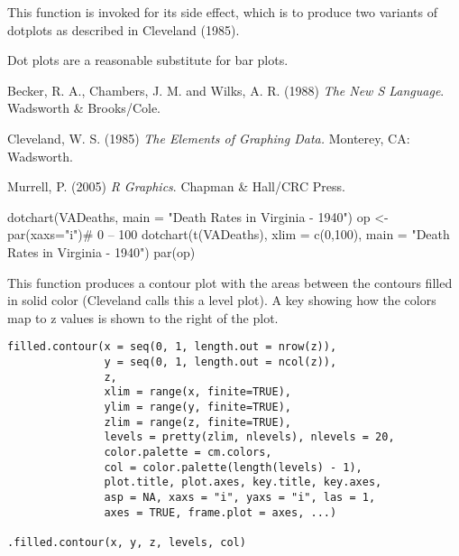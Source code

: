 %
\begin{Value}
This function is invoked for its side effect, which is to produce two
variants of dotplots as described in Cleveland (1985).

Dot plots are a reasonable substitute for bar plots.
\end{Value}
%
\begin{References}\relax
Becker, R. A., Chambers, J. M. and Wilks, A. R. (1988)
\emph{The New S Language}.
Wadsworth \& Brooks/Cole.

Cleveland, W. S. (1985)
\emph{The Elements of Graphing Data.}
Monterey, CA: Wadsworth.

Murrell, P. (2005) \emph{R Graphics}. Chapman \& Hall/CRC Press.
\end{References}
%
\begin{Examples}
\begin{ExampleCode}
dotchart(VADeaths, main = "Death Rates in Virginia - 1940")
op <- par(xaxs="i")# 0 -- 100%
dotchart(t(VADeaths), xlim = c(0,100),
         main = "Death Rates in Virginia - 1940")
par(op)
\end{ExampleCode}
\end{Examples}
%
\begin{Description}\relax
This function produces a contour plot with the areas between the
contours filled in solid color (Cleveland calls this a level plot).  A
key showing how the colors map to z values is shown to the right of
the plot.
\end{Description}
%
\begin{Usage}
\begin{verbatim}
filled.contour(x = seq(0, 1, length.out = nrow(z)),
               y = seq(0, 1, length.out = ncol(z)),
               z,
               xlim = range(x, finite=TRUE),
               ylim = range(y, finite=TRUE),
               zlim = range(z, finite=TRUE),
               levels = pretty(zlim, nlevels), nlevels = 20,
               color.palette = cm.colors,
               col = color.palette(length(levels) - 1),
               plot.title, plot.axes, key.title, key.axes,
               asp = NA, xaxs = "i", yaxs = "i", las = 1,
               axes = TRUE, frame.plot = axes, ...)

.filled.contour(x, y, z, levels, col)
\end{verbatim}
\end{Usage}
